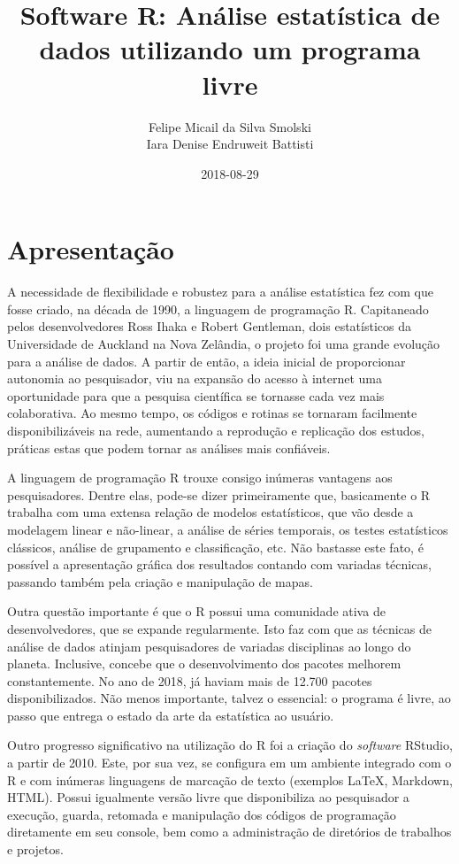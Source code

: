 \documentclass[12pt,brazil,oneside]{book}
\title{Software R: Análise estatística de dados utilizando um programa livre}
\author{Felipe Micail da Silva Smolski \\ Iara Denise Endruweit Battisti}
\date{2018-08-29}
\begin{document}
\maketitle

{
\setcounter{tocdepth}{1}
\tableofcontents
}
\hypertarget{apresentacao}{%
\chapter*{Apresentação}\label{apresentacao}}

A necessidade de flexibilidade e robustez para a análise estatística fez
com que fosse criado, na década de 1990, a linguagem de programação R.
Capitaneado pelos desenvolvedores Ross Ihaka e Robert Gentleman, dois
estatísticos da Universidade de Auckland na Nova Zelândia, o projeto foi
uma grande evolução para a análise de dados. A partir de então, a ideia
inicial de proporcionar autonomia ao pesquisador, viu na expansão do
acesso à internet uma oportunidade para que a pesquisa científica se
tornasse cada vez mais colaborativa. Ao mesmo tempo, os códigos e
rotinas se tornaram facilmente disponibilizáveis na rede, aumentando a
reprodução e replicação dos estudos, práticas estas que podem tornar as
análises mais confiáveis.

A linguagem de programação R trouxe consigo inúmeras vantagens aos
pesquisadores. Dentre elas, pode-se dizer primeiramente que, basicamente
o R trabalha com uma extensa relação de modelos estatísticos, que vão
desde a modelagem linear e não-linear, a análise de séries temporais, os
testes estatísticos clássicos, análise de grupamento e classificação,
etc. Não bastasse este fato, é possível a apresentação gráfica dos
resultados contando com variadas técnicas, passando também pela criação
e manipulação de mapas.

Outra questão importante é que o R possui uma comunidade ativa de
desenvolvedores, que se expande regularmente. Isto faz com que as
técnicas de análise de dados atinjam pesquisadores de variadas
disciplinas ao longo do planeta. Inclusive, concebe que o
desenvolvimento dos pacotes melhorem constantemente. No ano de 2018, já
haviam mais de 12.700 pacotes disponibilizados. Não menos importante,
talvez o essencial: o programa é livre, ao passo que entrega o estado da
arte da estatística ao usuário.

Outro progresso significativo na utilização do R foi a criação do
\emph{software} RStudio, a partir de 2010. Este, por sua vez, se
configura em um ambiente integrado com o R e com inúmeras linguagens de
marcação de texto (exemplos LaTeX, Markdown, HTML). Possui igualmente
versão livre que disponibiliza ao pesquisador a execução, guarda,
retomada e manipulação dos códigos de programação diretamente em seu
console, bem como a administração de diretórios de trabalhos e projetos.
\end{document}
